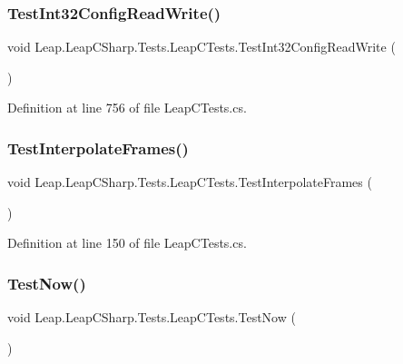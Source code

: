 \subsubsection{\texorpdfstring{TestInt32ConfigReadWrite()}{TestInt32ConfigReadWrite()}}
{\footnotesize\ttfamily void Leap.\+Leap\+C\+Sharp.\+Tests.\+Leap\+C\+Tests.\+Test\+Int32\+Config\+Read\+Write (\begin{DoxyParamCaption}{ }\end{DoxyParamCaption})}



Definition at line 756 of file Leap\+C\+Tests.\+cs.

\mbox{\label{class_leap_1_1_leap_c_sharp_1_1_tests_1_1_leap_c_tests_a8c4b2c7e793ea7adba0c47c005006433}} 
\subsubsection{\texorpdfstring{TestInterpolateFrames()}{TestInterpolateFrames()}}
{\footnotesize\ttfamily void Leap.\+Leap\+C\+Sharp.\+Tests.\+Leap\+C\+Tests.\+Test\+Interpolate\+Frames (\begin{DoxyParamCaption}{ }\end{DoxyParamCaption})}



Definition at line 150 of file Leap\+C\+Tests.\+cs.

\mbox{\label{class_leap_1_1_leap_c_sharp_1_1_tests_1_1_leap_c_tests_adde34c1811e7232528b77aa9ce3c35c3}} 
\subsubsection{\texorpdfstring{TestNow()}{TestNow()}}
{\footnotesize\ttfamily void Leap.\+Leap\+C\+Sharp.\+Tests.\+Leap\+C\+Tests.\+Test\+Now (\begin{DoxyParamCaption}{ }\end{DoxyParamCaption})}



